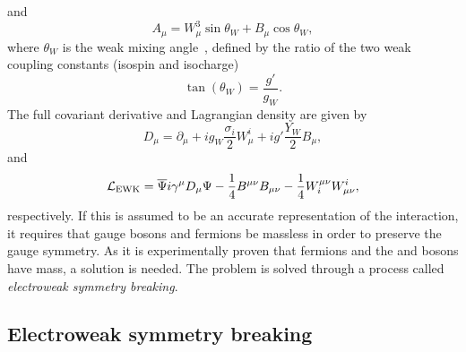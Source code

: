 and 
\begin{equation}
	A_{\mu} = W^{3}_{\mu}\sin{\theta_{W}} +  B_{\mu}\cos{\theta_{W}},
\end{equation}
where $\theta_{W}$ is the weak mixing angle~\cite{Th:SM1}, defined by the ratio of the two weak coupling constants (isospin and isocharge) 
\begin{equation}
	\tan(\theta_{W}) = \frac{g'}{g_{W}}.	
\end{equation}
The full \EWK{} covariant derivative and Lagrangian density are given by
\begin{equation}
D_{\mu} = \partial_{\mu}+ig_{W}\frac{\sigma_{i}}{2}W_{\mu}^{i}+ig'\frac{Y_{W}}{2}B_{\mu},
\end{equation}
and
\begin{equation}
\mathcal{L}_{\mathrm{EWK}}=\overline{\Psi}i\gamma^{\mu}D_{\mu}\Psi - \frac{1}{4}B^{\mu\nu}B_{\mu\nu} - \frac{1}{4}W^{\mu\nu}_{i}W_{\mu\nu}^{i},
\end{equation}
respectively.
If this is assumed to be an accurate representation of the \EWK{} interaction, it requires that gauge bosons and fermions be massless in order to preserve the gauge symmetry.
As it is experimentally proven that fermions and the \Wboson{} and \Zboson{} bosons have mass, a solution is needed.
The problem is solved through a process called \textit{electroweak symmetry breaking}.

\subsection{Electroweak symmetry breaking} %
\label{sub:electroweak_symmetry_breaking}

